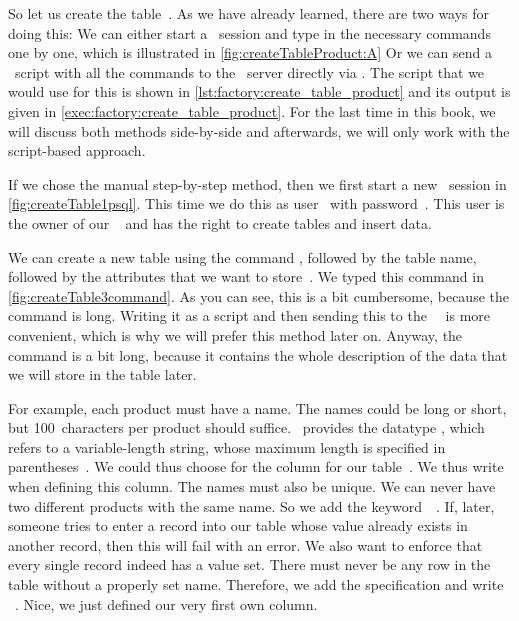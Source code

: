 %
%
%
%
So let us create the table~.
As we have already learned, there are two ways for doing this:
We can either start a \psql\ session and type in the necessary commands one by one, which is illustrated in \cref{fig:createTableProduct:A}%
Or we can send a \sql\ script with all the commands to the \postgresql\ server directly via \psql.
The script that we would use for this is shown in \cref{lst:factory:create_table_product} and its output is given in \cref{exec:factory:create_table_product}.
For the last time in this book, we will discuss both methods side-by-side and afterwards, we will only work with the script-based approach.

If we chose the manual step-by-step method, then we first start a new \psql\ session in \cref{fig:createTable1psql}.
This time we do this as user~ with password~.
This user is the owner of our \db\  and has the right to create tables and insert data.

We can create a new table using the command , followed by the table name, followed by the attributes that we want to store~\cite{PGDG:PD:CT2}.
We typed this command in \cref{fig:createTable3command}.
As you can see, this is a bit cumbersome, because the command is long.
Writing it as a script and then sending this to the \postgresql\ \dbms\ is more convenient, which is why we will prefer this method later on.
Anyway, the command is a bit long, because it contains the whole description of the data that we will store in the table later.

For example, each product must have a name.
The names could be long or short, but 100~characters per product should suffice.
\sql\ provides the datatype , which refers to a variable-length string, whose maximum length is specified in parentheses~\cite{PGDG:PD:CT}.
We could thus choose  for the column  for our table~.
We thus write~ when defining this column.
The names must also be unique.
We can never have two different products with the same name.
So we add the keyword~~\cite{PGDG:PD:C}.
If, later, someone tries to enter a record into our table whose  value already exists in another record, then this will fail with an error.
We also want to enforce that every single record indeed has a  value set.
There must never be any row in the table without a properly set name.
Therefore, we add the  specification and write ~\cite{PGDG:PD:C}.
Nice, we just defined our very first own column.

